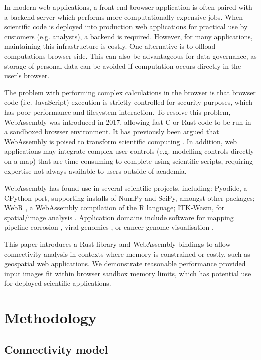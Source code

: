 \documentclass[11pt, a4paper]{article}
\newcommand{\Cpp}{C\nolinebreak[4]\hspace{-.05em}\raisebox{.4ex}{\relsize{-3}{\textbf{++}}}}
\begin{document}
In modern web applications, 
a front-end browser application is often paired with a backend server which performs more computationally expensive jobs. 
When scientific code is deployed into production web applications for practical use by customers (e.g. analysts),
a backend is required. However, for many applications, maintaining this infrastructure is costly. 
One alternative is to offload computations browser-side. This can also be advantageous for data governance,
as storage of personal data can be avoided if
computation occurs directly in the user's browser.

The problem with performing complex calculations in the browser is that browser code 
(i.e. JavaScript) execution is strictly controlled for security purposes, which has poor performance and filesystem interaction.
To resolve this problem, WebAssembly \cite{haas2017bringing} was introduced in 2017,
allowing fast \Cpp{} or Rust code to be run in a sandboxed browser environment. 
It has previously been argued that WebAssembly is poised to transform scientific computing \cite{perkel2024no}.
In addition, web applications may integrate complex user controls
(e.g. modelling controls directly on a map) that are time consuming to complete using scientific scripts,
requiring expertise not always available to users outside of academia.

WebAssembly has found use in several scientific projects, including: Pyodide, a CPython port, supporting installs of NumPy and SciPy, amongst other packages\cite{pyodide2026};
WebR \cite{webr2026}, a WebAssembly compilation of the R language; ITK-Wasm, for spatial/image analysis \cite{itkwasm2026}. 
Application domains include software for mapping pipeline corrosion \cite{guarneri2024web}, viral genomics \cite{ji2024viralwasm}, or cancer genome visualisation \cite{finney2018chromatic}.

This paper introduces a Rust library and WebAssembly bindings to allow connectivity analysis in contexts where memory is constrained or costly, 
such as geospatial web applications. We demonstrate reasonable
 performance provided input images fit within browser sandbox memory limits,
 which has potential use for deployed scientific applications.

\section{Methodology}

\subsection{Connectivity model}
\end{document}
